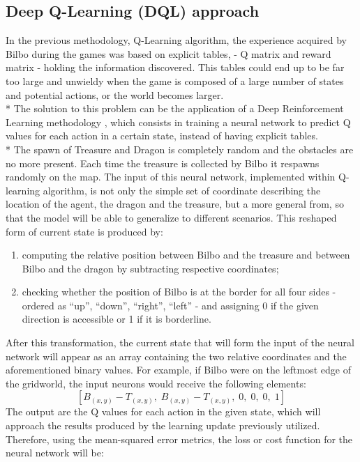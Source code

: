 \subsection{Deep Q-Learning (DQL) approach}
In the previous methodology, Q-Learning algorithm, the experience acquired by Bilbo during the games was based on explicit tables, - Q matrix and reward matrix - holding the information discovered. This tables could end up to be far too large and unwieldy when the game is composed of a large number of states and potential actions, or the world becomes larger.\\*
The solution to this problem can be the application of a Deep Reinforcement Learning methodology \cite{3,5,6}, which consists in training a neural network to predict Q values for each action in a certain state, instead of having explicit tables.\\*
The spawn of Treasure and Dragon is completely random and the obstacles are no more present.
Each time the treasure is collected by Bilbo it respawns randomly on the map.
The input of this neural network, implemented within Q-learning algorithm, is not only the simple set of coordinate describing the location of the agent, the dragon and the treasure, but a more general from, so that the model will be able to generalize to different scenarios. This reshaped form of current state is produced by:
\begin{enumerate}[noitemsep, topsep=0ex]
  \item computing the relative position between Bilbo and the treasure and between Bilbo and the dragon by subtracting respective coordinates;
  \item checking whether the position of Bilbo is at the border for all four sides - ordered as ``up'', ``down'', ``right'', ``left'' - and assigning 0 if the given direction is accessible or 1 if it is borderline.
\end{enumerate}
After this transformation, the current state that will form the input of the neural network will appear as an array containing the two relative coordinates and the aforementioned binary values. For example, if Bilbo were on the leftmost edge of the gridworld, the input neurons would receive the following elements:
$$
[B_{(x,y)}-T_{(x,y)},\;B_{(x,y)}-T_{(x,y)},\;0,\;0,\;0,\;1]
$$
The output are the Q values for each action in the given state, which will approach the results produced by the learning update previously utilized. Therefore, using the mean-squared error metrics, the loss or cost function for the neural network will be:
